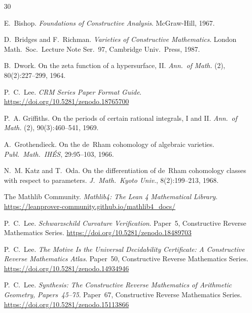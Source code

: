\documentclass[11pt]{article}
\theoremstyle{plain}
\theoremstyle{definition}
\theoremstyle{remark}
\begin{document}
\begin{thebibliography}{30}

E.~Bishop.
\newblock \emph{Foundations of Constructive Analysis}.
\newblock McGraw-Hill, 1967.

D.~Bridges and F.~Richman.
\newblock \emph{Varieties of Constructive Mathematics}.
\newblock London Math.\ Soc.\ Lecture Note Ser.~97,
  Cambridge Univ.\ Press, 1987.

B.~Dwork.
\newblock On the zeta function of a hypersurface, II.
\newblock \emph{Ann.\ of Math.} (2), 80(2):227--299, 1964.

P.~C.~Lee.
\newblock \emph{CRM Series Paper Format Guide}.
\newblock \url{https://doi.org/10.5281/zenodo.18765700}

P.~A. Griffiths.
\newblock On the periods of certain rational integrals, I and II.
\newblock \emph{Ann.\ of Math.} (2), 90(3):460--541, 1969.

A.~Grothendieck.
\newblock On the de~Rham cohomology of algebraic varieties.
\newblock \emph{Publ.\ Math.\ IH\'ES}, 29:95--103, 1966.

N.~M. Katz and T.~Oda.
\newblock On the differentiation of de~Rham cohomology classes
  with respect to parameters.
\newblock \emph{J.~Math.\ Kyoto Univ.}, 8(2):199--213, 1968.

The Mathlib Community.
\newblock \emph{Mathlib4: The Lean 4 Mathematical Library}.
\newblock \url{https://leanprover-community.github.io/mathlib4_docs/}

P.~C.~Lee.
\newblock \emph{Schwarzschild Curvature Verification}.
\newblock Paper~5, Constructive Reverse Mathematics Series.
\newblock \url{https://doi.org/10.5281/zenodo.18489703}

P.~C.~Lee.
\newblock \emph{The Motive Is the Universal Decidability Certificate:
  A Constructive Reverse Mathematics Atlas}.
\newblock Paper~50, Constructive Reverse Mathematics Series.
\newblock \url{https://doi.org/10.5281/zenodo.14934946}

P.~C.~Lee.
\newblock \emph{Synthesis: The Constructive Reverse Mathematics
  of Arithmetic Geometry, Papers~45--75}.
\newblock Paper~67, Constructive Reverse Mathematics Series.
\newblock \url{https://doi.org/10.5281/zenodo.15113866}


\end{thebibliography}
\end{document}

